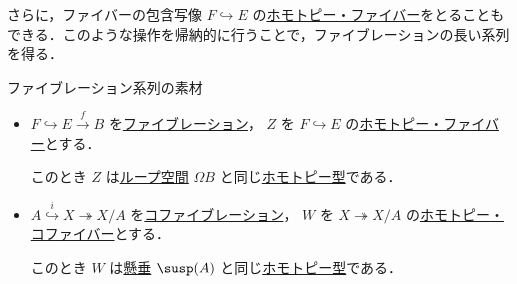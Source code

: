\documentclass[algtopo_main]{subfiles}
\begin{document}
さらに，ファイバーの包含写像 $F \hookrightarrow E$ の\hyperref[def:homotopy-fiber]{ホモトピー・ファイバー}をとることもできる．このような操作を帰納的に行うことで，ファイブレーションの長い系列を得る．

\begin{mytheo}[label=thm:homotopyF-step]{ファイブレーション系列の素材}
    \begin{itemize}
        \item $F \hookrightarrow E \xrightarrow{f} B$ を\hyperref[def:fibration]{ファイブレーション}，
        $Z$ を $F \hookrightarrow E$ の\hyperref[def:homotopy-fiber]{ホモトピー・ファイバー}とする．
        
        このとき $Z$ は\hyperref[def:path-loop]{ループ空間} $\Omega B$ と同じ\hyperref[def:homotopy-basic]{ホモトピー型}である．
        \item $A \stackrel{i}{\hookrightarrow} X \twoheadrightarrow X/A$ を\hyperref[def:cofibration]{コファイブレーション}，
        $W$ を $X \twoheadrightarrow X/A$ の\hyperref[def:homotopy-fiber]{ホモトピー・コファイバー}とする．
        
        このとき $W$ は\hyperref[def:suspension]{懸垂} $\susp(A)$ と同じ\hyperref[def:homotopy-basic]{ホモトピー型}である．
    \end{itemize}
    
\end{mytheo}
\end{document}
